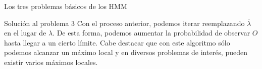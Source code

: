 \begin{section}{Los tres problemas básicos de los HMM}
\begin{subsection}{Solución al problema 3}
Con el proceso anterior, podemos iterar reemplazando $\overline{\lambda}$ en el lugar de $\lambda$. De esta forma, podemos aumentar la probabilidad de observar $O$ hasta llegar a un cierto límite. Cabe destacar que con este algoritmo sólo podemos alcanzar un máximo local y en diversos problemas de interés, pueden existir varios máximos locales.


\end{subsection}

\end{section}
